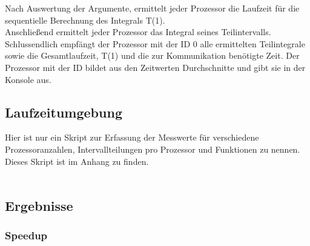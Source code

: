 \documentclass[a4paper,12pt]{scrartcl}
\begin{document}
Nach Auswertung der Argumente, ermittelt jeder Prozessor die Laufzeit f\"ur die sequentielle Berechnung des Integrals T(1).\\
Anschlie\ss{}end ermittelt jeder Prozessor das Integral seines Teilintervalls.
Schlussendlich empf\"angt der Prozessor mit der ID 0 alle ermittelten Teilintegrale sowie die Gesamtlaufzeit, T(1) und die zur
Kommunikation ben\"otigte Zeit.
Der Prozessor mit der ID bildet aus den Zeitwerten Durchschnitte und gibt sie in der Konsole aus.


\subsection{Laufzeitumgebung}
Hier ist nur ein Skript zur Erfassung der Messwerte f\"ur verschiedene Prozessoranzahlen, Intervallteilungen pro Prozessor und Funktionen zu nennen.\\
Dieses Skript ist im Anhang  zu finden.\\\\


\subsection{Ergebnisse}
\subsubsection{Speedup}
\end{document}

